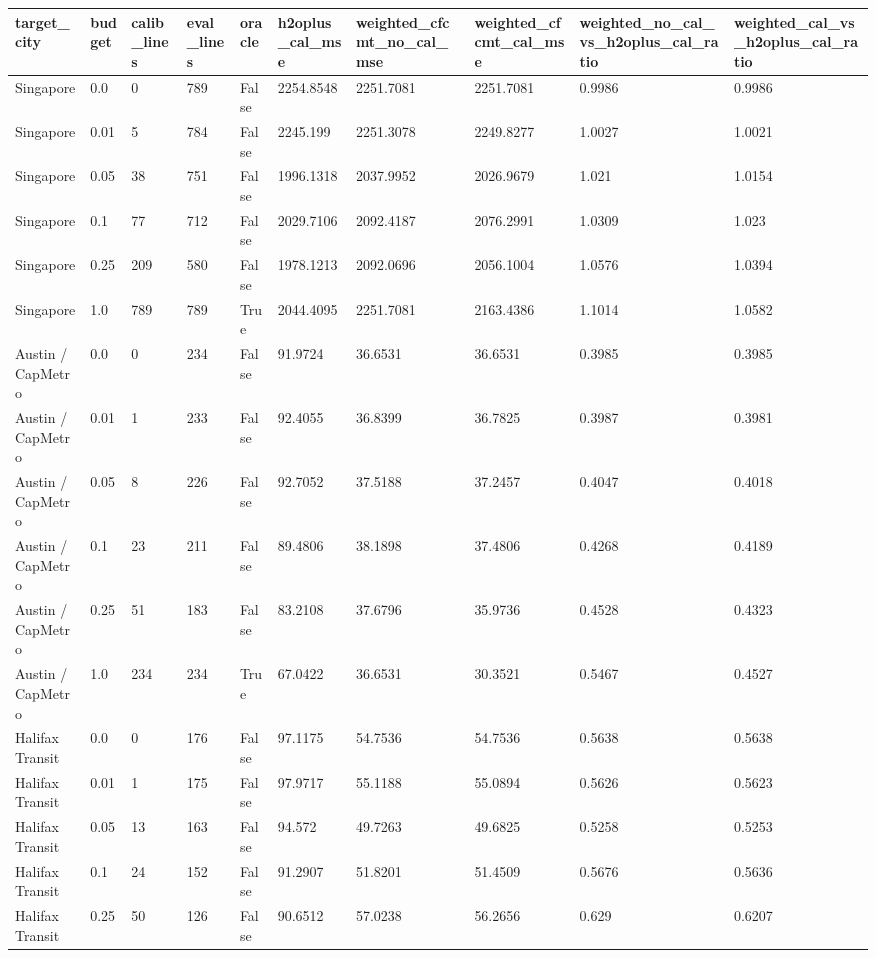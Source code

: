 \begin{tabular}{llllllllll}
\toprule
target\_city & budget & calib\_lines & eval\_lines & oracle & h2oplus\_cal\_mse & weighted\_cfcmt\_no\_cal\_mse & weighted\_cfcmt\_cal\_mse & weighted\_no\_cal\_vs\_h2oplus\_cal\_ratio & weighted\_cal\_vs\_h2oplus\_cal\_ratio \\
\midrule
Singapore & 0.0 & 0 & 789 & False & 2254.8548 & 2251.7081 & 2251.7081 & 0.9986 & 0.9986 \\
Singapore & 0.01 & 5 & 784 & False & 2245.199 & 2251.3078 & 2249.8277 & 1.0027 & 1.0021 \\
Singapore & 0.05 & 38 & 751 & False & 1996.1318 & 2037.9952 & 2026.9679 & 1.021 & 1.0154 \\
Singapore & 0.1 & 77 & 712 & False & 2029.7106 & 2092.4187 & 2076.2991 & 1.0309 & 1.023 \\
Singapore & 0.25 & 209 & 580 & False & 1978.1213 & 2092.0696 & 2056.1004 & 1.0576 & 1.0394 \\
Singapore & 1.0 & 789 & 789 & True & 2044.4095 & 2251.7081 & 2163.4386 & 1.1014 & 1.0582 \\
Austin / CapMetro & 0.0 & 0 & 234 & False & 91.9724 & 36.6531 & 36.6531 & 0.3985 & 0.3985 \\
Austin / CapMetro & 0.01 & 1 & 233 & False & 92.4055 & 36.8399 & 36.7825 & 0.3987 & 0.3981 \\
Austin / CapMetro & 0.05 & 8 & 226 & False & 92.7052 & 37.5188 & 37.2457 & 0.4047 & 0.4018 \\
Austin / CapMetro & 0.1 & 23 & 211 & False & 89.4806 & 38.1898 & 37.4806 & 0.4268 & 0.4189 \\
Austin / CapMetro & 0.25 & 51 & 183 & False & 83.2108 & 37.6796 & 35.9736 & 0.4528 & 0.4323 \\
Austin / CapMetro & 1.0 & 234 & 234 & True & 67.0422 & 36.6531 & 30.3521 & 0.5467 & 0.4527 \\
Halifax Transit & 0.0 & 0 & 176 & False & 97.1175 & 54.7536 & 54.7536 & 0.5638 & 0.5638 \\
Halifax Transit & 0.01 & 1 & 175 & False & 97.9717 & 55.1188 & 55.0894 & 0.5626 & 0.5623 \\
Halifax Transit & 0.05 & 13 & 163 & False & 94.572 & 49.7263 & 49.6825 & 0.5258 & 0.5253 \\
Halifax Transit & 0.1 & 24 & 152 & False & 91.2907 & 51.8201 & 51.4509 & 0.5676 & 0.5636 \\
Halifax Transit & 0.25 & 50 & 126 & False & 90.6512 & 57.0238 & 56.2656 & 0.629 & 0.6207 \\

\end{tabular}
